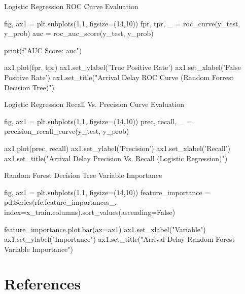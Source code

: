\documentclass[a4paper,12pt]{article}
\begin{document}
Logistic Regression ROC Curve Evaluation
\begin{python}
fig, ax1 = plt.subplots(1,1, figsize=(14,10))
fpr, tpr, _ = roc_curve(y_test, y_prob)
auc = roc_auc_score(y_test, y_prob)

print(f"AUC Score: {auc}")

ax1.plot(fpr, tpr)
ax1.set_ylabel('True Positive Rate')
ax1.set_xlabel('False Positive Rate')
ax1.set_title("Arrival Delay ROC Curve (Random Forrest Decision Tree)")
\end{python}

Logistic Regression Recall Vs. Precision Curve Evaluation
\begin{python}
fig, ax1 = plt.subplots(1,1, figsize=(14,10))
prec, recall, _ = precision_recall_curve(y_test, y_prob)

ax1.plot(prec, recall)
ax1.set_ylabel('Precision')
ax1.set_xlabel('Recall')
ax1.set_title("Arrival Delay Precision Vs. Recall (Logistic Regression)")


\end{python}

Random Forest Decision Tree Variable Importance

\begin{python}
fig, ax1 = plt.subplots(1,1, figsize=(14,10))
feature_importance = pd.Series(rfc.feature_importances_, index=x_train.columns).sort_values(ascending=False)

feature_importance.plot.bar(ax=ax1)
ax1.set_xlabel("Variable")
ax1.set_ylabel("Importance")
ax1.set_title("Arrival Delay  Random Forest Variable Importance")
\end{python}


\pagebreak


\section{References}


\end{document}
